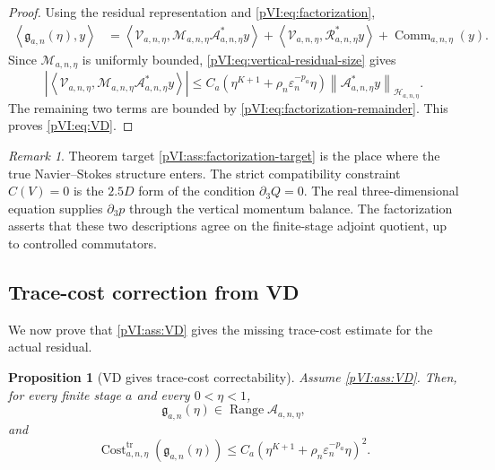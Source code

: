 \documentclass[11pt]{article}
\numberwithin{equation}{section}
\theoremstyle{plain}
\newtheorem{proposition}{Proposition}[section]
\theoremstyle{definition}
\theoremstyle{remark}
\newtheorem{remark}{Remark}[section]
\DeclareMathOperator{\Range}{Range}
\DeclareMathOperator{\Cost}{Cost}
\newcommand{\eps}{\varepsilon}
\newcommand{\tr}{\operatorname{tr}}
\newcommand{\norm}[2]{\left\|#1\right\|_{#2}}
\newcommand{\inner}[2]{\left\langle #1,#2\right\rangle}
\newcommand{\calA}{\mathcal A}
\newcommand{\calH}{\mathcal H}
\newcommand{\calM}{\mathcal M}
\newcommand{\calR}{\mathcal R}
\newcommand{\calV}{\mathcal V}
\begin{document}
\begin{proof}
Using the residual representation and \eqref{pVI:eq:factorization},
\[
\begin{aligned}
        \inner{\mathfrak g_{a,n}(\eta)}{y}
        &=
        \inner{\calV_{a,n,\eta}}{\calM_{a,n,\eta}\calA_{a,n,\eta}^*y}
        +
        \inner{\calV_{a,n,\eta}}{\calR_{a,n,\eta}^*y}
        +
        \operatorname{Comm}_{a,n,\eta}(y).
\end{aligned}
\]
Since \(\calM_{a,n,\eta}\) is uniformly bounded, \eqref{pVI:eq:vertical-residual-size} gives
\[
        \left|
        \inner{\calV_{a,n,\eta}}{\calM_{a,n,\eta}\calA_{a,n,\eta}^*y}
        \right|
        \le
        C_a
        \left(
        \eta^{K+1}
        +
        \rho_n\eps_n^{-p_a}\eta
        \right)
        \norm{\calA_{a,n,\eta}^*y}{\calH_{a,n,\eta}}.
\]
The remaining two terms are bounded by \eqref{pVI:eq:factorization-remainder}.  This proves
\eqref{pVI:eq:VD}.
\end{proof}

\begin{remark}
Theorem target \cref{pVI:ass:factorization-target} is the place where the true Navier--Stokes structure
enters.  The strict compatibility constraint \(C(V)=0\) is the \(2.5D\) form of the condition
\(\partial_3Q=0\).  The real three-dimensional equation supplies \(\partial_3p\) through the vertical
momentum balance.  The factorization asserts that these two descriptions agree on the finite-stage
adjoint quotient, up to controlled commutators.
\end{remark}

\subsection{Trace-cost correction from VD}

We now prove that \cref{pVI:ass:VD} gives the missing trace-cost estimate for the actual residual.

\begin{proposition}[VD gives trace-cost correctability]\label{pVI:prop:VD-trace-cost}
Assume \cref{pVI:ass:VD}.  Then, for every finite stage \(a\) and every \(0<\eta<1\),
\[
        \mathfrak g_{a,n}(\eta)\in \Range \calA_{a,n,\eta},
\]
and
\begin{equation}\label{pVI:eq:trace-cost-bound}
        \Cost_{a,n,\eta}^{\tr}(\mathfrak g_{a,n}(\eta))
        \le
        C_a
        \left(
        \eta^{K+1}
        +
        \rho_n\eps_n^{-p_a}\eta
        \right)^2 .
\end{equation}
\end{proposition}
\end{document}
